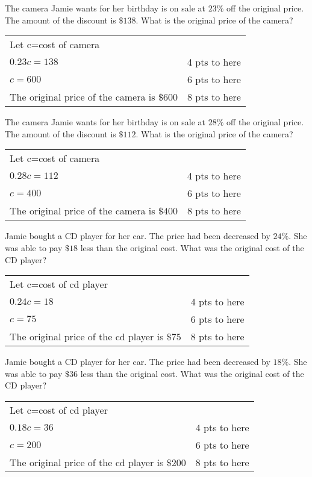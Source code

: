{
	The camera Jamie wants for her birthday is on sale at $23\%$ off the original price. The amount of the discount is $\$138$. What is the original price of the camera?
}
{
	\begin{tabular}{l r}
	Let c=cost of camera \\
	$0.23c=138$ & 4 pts to here\\
	$c=600$ & 6 pts to here\\
	The original price of the camera is $\$600$ & 8 pts to here
	\end{tabular}
}

{
	The camera Jamie wants for her birthday is on sale at $28\%$ off the original price. The amount of the discount is $\$112$. What is the original price of the camera?
}
{
	\begin{tabular}{l r}
	Let c=cost of camera \\
	$0.28c=112$ & 4 pts to here\\
	$c=400$ & 6 pts to here\\
	The original price of the camera is $\$400$ & 8 pts to here
	\end{tabular}
}

{
	Jamie bought a CD player for her car. The price had been decreased by $24\%$. She was able to pay $\$18$ less than the original cost. What was the original cost of the CD player?
}
{
	\begin{tabular}{l r}
	Let c=cost of cd player \\
	$0.24c=18$ & 4 pts to here\\
	$c=75$ & 6 pts to here\\
	The original price of the cd player is $\$75$ & 8 pts to here
	\end{tabular}
}

{
	Jamie bought a CD player for her car. The price had been decreased by $18\%$. She was able to pay $\$36$ less than the original cost. What was the original cost of the CD player?
}
{
	\begin{tabular}{l r}
	Let c=cost of cd player \\
	$0.18c=36$ & 4 pts to here\\
	$c=200$ & 6 pts to here\\
	The original price of the cd player is $\$200$ & 8 pts to here
	\end{tabular}
}
